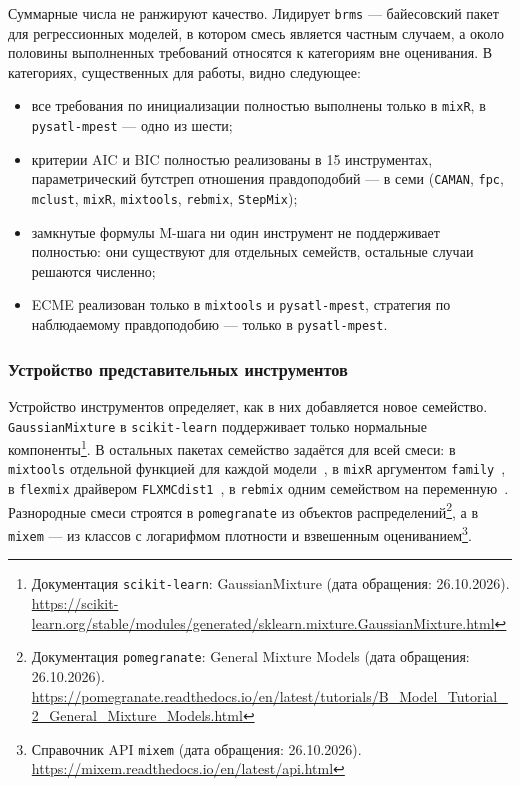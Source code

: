 Суммарные числа не ранжируют качество. Лидирует \texttt{brms} --- байесовский пакет для регрессионных моделей, в котором смесь является частным случаем, а около половины выполненных требований относятся к категориям вне оценивания. В категориях, существенных для работы, видно следующее:
\begin{itemize}
    \item все требования по инициализации полностью выполнены только в \texttt{mixR}, в \texttt{pysatl-mpest} --- одно из шести;
    \item критерии AIC и BIC полностью реализованы в 15 инструментах, параметрический бутстреп отношения правдоподобий --- в семи (\texttt{CAMAN}, \texttt{fpc}, \texttt{mclust}, \texttt{mixR}, \texttt{mixtools}, \texttt{rebmix}, \texttt{StepMix});
    \item замкнутые формулы M-шага ни один инструмент не поддерживает полностью: они существуют для отдельных семейств, остальные случаи решаются численно;
    \item ECME реализован только в \texttt{mixtools} и \texttt{pysatl-mpest}, стратегия по наблюдаемому правдоподобию --- только в \texttt{pysatl-mpest}.
\end{itemize}

\subsubsection{Устройство представительных инструментов}

Устройство инструментов определяет, как в них добавляется новое семейство. \texttt{GaussianMixture} в \texttt{scikit-learn} поддерживает только нормальные компоненты\footnote{Документация \texttt{scikit-learn}: GaussianMixture (дата обращения: 26.10.2026). \url{https://scikit-learn.org/stable/modules/generated/sklearn.mixture.GaussianMixture.html}}. В остальных пакетах семейство задаётся для всей смеси: в \texttt{mixtools} отдельной функцией для каждой модели~\cite{Benaglia2009}, в \texttt{mixR} аргументом \texttt{family}~\cite{Yu2022}, в \texttt{flexmix} драйвером \texttt{FLXMCdist1}~\cite{Leisch2004,GrunLeisch2008}, в \texttt{rebmix} одним семейством на переменную~\cite{Nagode2015}. Разнородные смеси строятся в \texttt{pomegranate} из объектов распределений\footnote{Документация \texttt{pomegranate}: General Mixture Models (дата обращения: 26.10.2026). \url{https://pomegranate.readthedocs.io/en/latest/tutorials/B_Model_Tutorial_2_General_Mixture_Models.html}}, а в \texttt{mixem} --- из классов с логарифмом плотности и взвешенным оцениванием\footnote{Справочник API \texttt{mixem} (дата обращения: 26.10.2026). \url{https://mixem.readthedocs.io/en/latest/api.html}}.

